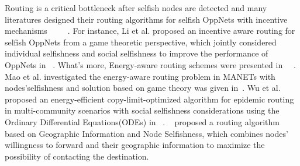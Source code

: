 Routing is a critical bottleneck after selfish nodes are detected and many literatures designed their routing algorithms for selfish OppNets with incentive mechanisms~\cite{DBLP:journals/access/WangWGFL18}~\cite{DBLP:conf/ciss/ChhabraVS17}~\cite{DBLP:conf/wcsp/LiQZC16}~\cite{DBLP:journals/tvt/CaiFW16}~\cite{DBLP:journals/tpds/ChenSY15}. 
For instance, Li et al. proposed an incentive aware routing for selfish OppNets from a game theoretic perspective, which jointly considered individual selfishness and social selfishness to improve the performance of OppNets in ~\cite{DBLP:conf/wcsp/LiQZC16}.
What's more, Energy-aware routing schemes were presented in ~\cite{DBLP:journals/monet/MaoZ15}~\cite{DBLP:conf/globecom/WuZLYP16}. Mao et al. investigated the energy-aware routing problem in MANETs with nodes'selfishness and solution based on game theory was given in~\cite{DBLP:journals/monet/MaoZ15}. Wu et al. proposed an energy-efficient copy-limit-optimized algorithm for epidemic routing in multi-community scenarios with social selfishness considerations using the Ordinary Differential Equations(ODEs) in ~\cite{DBLP:conf/globecom/WuZLYP16}. ~\cite{7914197} proposed a routing algorithm based on Geographic Information and Node Selfishness, which combines nodes' willingness to forward and their geographic information to maximize the possibility of contacting the destination.
